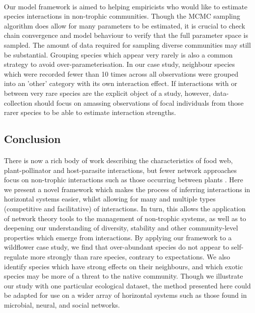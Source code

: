 \documentclass[a4,12pt]{article}
\begin{document}
        \paragraph{}
        Our model framework is aimed to helping empiricists who would like to estimate species interactions in non-trophic communities. Though the MCMC sampling algorithm does allow for many parameters to be estimated, it is crucial to check chain convergence and model behaviour to verify that the full parameter space is sampled. The amount of data required for sampling diverse communities may still be substantial. Grouping species which appear very rarely is also a common strategy to avoid over-parameterisation. In our case study, neighbour species which were recorded fewer than 10 times across all observations were grouped into an 'other' category with its own interaction effect. If interactions with or between very rare species are the explicit object of a study, however, data-collection should focus on amassing observations of focal individuals from those rarer species to be able to estimate  interaction strengths.   

\subsection{Conclusion}

    \paragraph{} 
    There is now a rich body of work describing the characteristics of food web, plant-pollinator and host-parasite interactions, but fewer network approaches focus on non-trophic interactions such as those occurring between plants \parencite{Ellison2019}. Here we present a novel framework which makes the process of inferring  interactions in horizontal systems easier, whilst allowing for many and multiple types (competitive and facilitative) of interactions. In turn, this allows the application of  network theory tools to the management of non-trophic systems, as well as to deepening our understanding of diversity, stability and other community-level properties which emerge from interactions. By applying our framework to a wildflower case study, we find that over-abundant species do not appear to self-regulate more strongly than rare species, contrary to expectations. We also identify species which have strong effects on their neighbours, and which exotic species may be more of a threat to the native community. Though we illustrate our study with one particular ecological dataset, the method presented here could be adapted for use on a wider array of  horizontal systems such as those found in microbial, neural, and social networks. 
   
\end{document}
